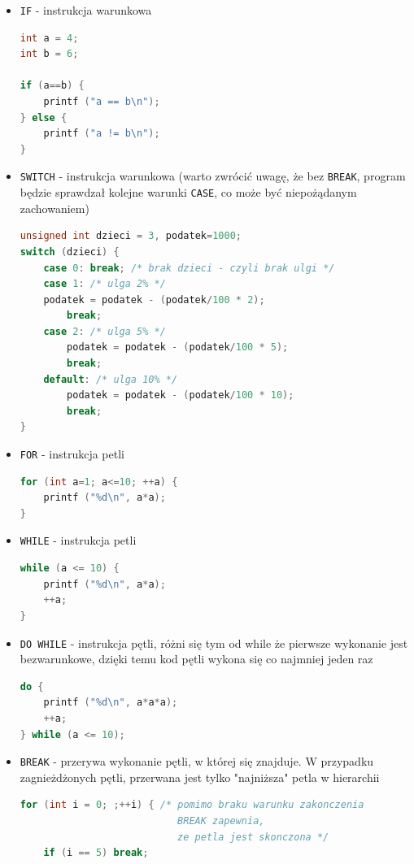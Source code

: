 \documentclass[a4paper,12pt,oneside]{book}
\begin{document}
				\begin{itemize}
					\item \verb*|IF| - instrukcja warunkowa
					\begin{lstlisting}[language=C]
int a = 4;  
int b = 6;

if (a==b) { 
    printf ("a == b\n"); 
} else { 
    printf ("a != b\n"); 
} 
					\end{lstlisting}
					\item \verb*|SWITCH| - instrukcja warunkowa (warto zwrócić uwagę, że bez \verb*|BREAK|, program będzie sprawdzał kolejne warunki \verb*|CASE|, co może być niepożądanym zachowaniem)
					\begin{lstlisting}[language=C]
unsigned int dzieci = 3, podatek=1000; 
switch (dzieci) { 
    case 0: break; /* brak dzieci - czyli brak ulgi */ 
    case 1: /* ulga 2% */ 
    podatek = podatek - (podatek/100 * 2); 
        break; 
    case 2: /* ulga 5% */ 
        podatek = podatek - (podatek/100 * 5); 
        break; 
    default: /* ulga 10% */ 
        podatek = podatek - (podatek/100 * 10); 
        break; 
} 
					\end{lstlisting}
					\item \verb*|FOR| - instrukcja petli
					\begin{lstlisting}[language=C]
for (int a=1; a<=10; ++a) { 
    printf ("%d\n", a*a); 
}
					\end{lstlisting}
					\item \verb*|WHILE| - instrukcja petli
					\begin{lstlisting}[language=C]
while (a <= 10) {
    printf ("%d\n", a*a);
    ++a;
} 
					\end{lstlisting}
					\item \verb*|DO WHILE| - instrukcja pętli, różni się tym od while że pierwsze wykonanie jest bezwarunkowe, dzięki temu kod pętli wykona się co najmniej jeden raz
					\begin{lstlisting}[language=C]
do { 
    printf ("%d\n", a*a*a); 
    ++a; 
} while (a <= 10);
					\end{lstlisting}
				\item \verb*|BREAK| - przerywa wykonanie pętli, w której się znajduje. W przypadku zagnieżdżonych pętli, przerwana jest tylko "najniższa" petla w hierarchii
				\begin{lstlisting}[language=C]
for (int i = 0; ;++i) { /* pomimo braku warunku zakonczenia
                           BREAK zapewnia, 
                           ze petla jest skonczona */
    if (i == 5) break; 

\end{lstlisting}
\end{itemize}
\end{document}
